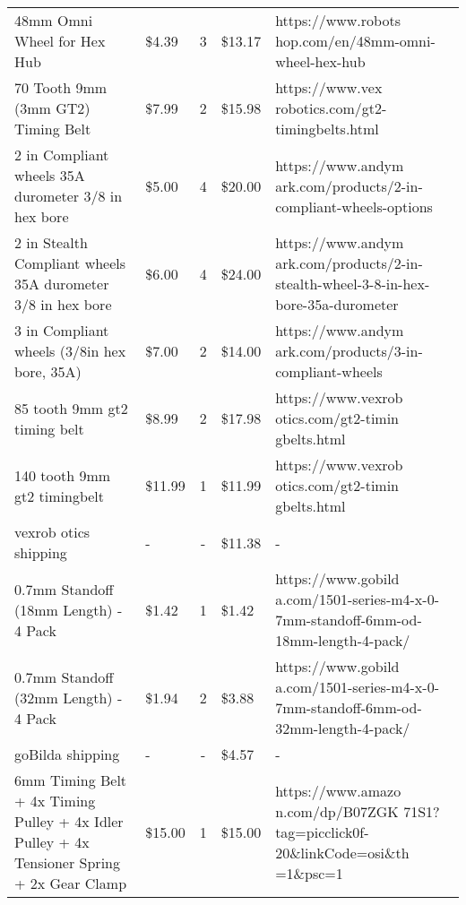 \begin{longtable}{p{}  p{}  c  p{}  p{}}
    48mm Omni Wheel for Hex Hub & \$4.39 & 3 & \$13.17 & https://www.robots hop.com/en/48mm-omni-wheel-hex-hub\\
    
    70 Tooth 9mm (3mm GT2) Timing Belt & \$7.99 & 2 & \$15.98 & https://www.vex robotics.com/gt2-timingbelts.html\\
    
    2 in Compliant wheels 35A durometer 3/8 in hex bore & \$5.00 & 4 & \$20.00 & https://www.andym ark.com/products/2-in-compliant-wheels-options\\
    
    2 in Stealth Compliant wheels 35A durometer 3/8 in hex bore & \$6.00 & 4 & \$24.00 & https://www.andym ark.com/products/2-in-stealth-wheel-3-8-in-hex-bore-35a-durometer\\
    
    3 in Compliant wheels (3/8in hex bore, 35A) & \$7.00 & 2 & \$14.00 & https://www.andym ark.com/products/3-in-compliant-wheels\\
    
    85 tooth 9mm gt2 timing belt & \$8.99 & 2 & \$17.98 & https://www.vexrob otics.com/gt2-timin gbelts.html\\
    
    140 tooth 9mm gt2 timingbelt & \$11.99 & 1 & \$11.99 & https://www.vexrob otics.com/gt2-timin gbelts.html\\
    
    vexrob otics shipping & - & - & \$11.38 & -\\
    
    0.7mm Standoff (18mm Length) - 4 Pack & \$1.42 & 1 & \$1.42 & https://www.gobild a.com/1501-series-m4-x-0-7mm-standoff-6mm-od-18mm-length-4-pack/\\
    
    0.7mm Standoff (32mm Length) - 4 Pack & \$1.94 & 2 & \$3.88 & https://www.gobild a.com/1501-series-m4-x-0-7mm-standoff-6mm-od-32mm-length-4-pack/\\
    
    goBilda shipping & - & - & \$4.57 & -\\
    
    6mm Timing Belt + 4x Timing Pulley + 4x Idler Pulley + 4x Tensioner Spring + 2x Gear Clamp & \$15.00 & 1 & \$15.00 & https://www.amazo n.com/dp/B07ZGK 71S1?tag=picclick0f-20\&linkCode=osi\&th =1\&psc=1\\
\end{longtable}

